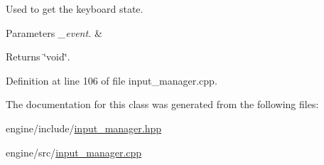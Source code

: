 Used to get the keyboard state.


\begin{DoxyParams}{Parameters}
{\em \+\_\+event.} & \\
\hline
\end{DoxyParams}
\begin{DoxyReturn}{Returns}
\char`\"{}void\char`\"{}. 
\end{DoxyReturn}


Definition at line 106 of file input\+\_\+manager.\+cpp.



The documentation for this class was generated from the following files\+:\begin{DoxyCompactItemize}
\item 
engine/include/\hyperlink{input__manager_8hpp}{input\+\_\+manager.\+hpp}\item 
engine/src/\hyperlink{input__manager_8cpp}{input\+\_\+manager.\+cpp}\end{DoxyCompactItemize}
